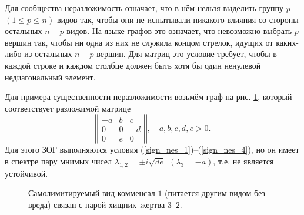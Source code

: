     Для сообщества неразложимость означает, что в нём нельзя выделить группу \(p\) \( (1 \leq p \leq n)\) видов так, чтобы они не испытывали никакого влияния со стороны остальных \(n-p\) видов. На языке графов это означает, что невозможно выбрать \(p\) вершин так, чтобы ни одна из них не служила концом стрелок, идущих от каких-либо из остальных \(n-p\) вершин. Для матриц это условие требует, чтобы в каждой строке и каждом столбце должен быть хотя бы один ненулевой недиагональный элемент.

    Для примера существенности неразложимости возьмём граф на рис. \ref{example_sign_zog_3}, который соответствует разложимой матрице
    \begin{equation}
        \left\Vert \begin{matrix}
            -a & b & c \\
            0 & 0 & -d \\
            0 & e & 0 
        \end{matrix} \right\Vert, 
        \quad a, b, c, d, e > 0.
    \end{equation}
    Для этого ЗОГ выполняются условия (\ref{sign_nes_1})--(\ref{sign_nes_4}), но он имеет в спектре пару мнимых чисел \(\lambda_{1,2} = \pm i \sqrt{de} ~~ (\lambda_3 = -a)\), т.е. не является устойчивой.
    
    \begin{figure}[H]
        \centering
        \caption{Самолимитируемый вид-комменсал \(1\) (питается другим видом без вреда) связан с парой хищник--жертва \(3\)--\(2\).} \label{example_sign_zog_3}
    \end{figure}

